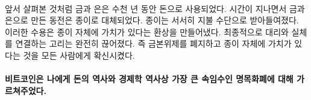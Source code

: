 \paragraph{}
\begin{comment}
	As we have seen, gold and silver were used as money for millennia. Over
	time, coins made from gold and silver were replaced by paper. Paper
	slowly became accepted as payment. This acceptance created an
	illusion --- the illusion that the paper itself has value. The final
	move was to completely sever the link between the representation and the
	actual: abolishing the gold standard and convincing everyone that the
	paper in itself is precious.
\end{comment}
앞서 살펴본 것처럼 금과 은은 수천 년 동안 돈으로 사용되었다. 
시간이 지나면서 금과 은으로 만든 동전은 종이로 대체되었다. 
종이는 서서히 지불 수단으로 받아들여졌다. 
이러한 수용은 종이 자체에 가치가 있다는 환상을 만들어냈다. 
최종적으로 대리와 실체를 연결하는 고리는 완전히 끊어졌다.
즉 금본위제를 폐지하고 종이 자체에 가치가 있다는 것을 모든 사람에게 확신시켰다.

\begin{comment}
	\paragraph{Bitcoin taught me about the history of money and the greatest sleight of
		hand in the history of economics: fiat currency.}
\end{comment}
\paragraph{비트코인은 나에게 돈의 역사와 경제학 역사상 가장 큰 속임수인 명목화폐에 대해 가르쳐주었다.}

%
%
%
%
